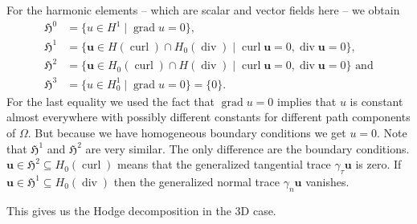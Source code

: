 \documentclass[12pt,a4paper]{article}
\numberwithin{equation}{subsection}
\numberwithin{lemma}{subsection}
\theoremstyle{definition}
\DeclareMathOperator{\curl}{curl}
\DeclareMathOperator{\diver}{div}
\DeclareMathOperator{\grad}{grad}
\begin{document}
For the harmonic elements -- which are scalar and vector fields here -- 
we obtain
\begin{align*}
    \mathfrak{H}^0 &= \{ u \in H^1 \mid \grad u = 0\},
    \\ \mathfrak{H}^1 &= \{ \mathbf{u} \in H(\curl) \cap H_0(\diver)
        \mid \curl \mathbf{u} = 0, \diver \mathbf{u} = 0\},
    \\ \mathfrak{H}^2 &= \{ \mathbf{u} \in H_0(\curl) \cap H(\diver)
        \mid \curl \mathbf{u} = 0, \diver \mathbf{u} = 0\} \text{ and}
    \\ \mathfrak{H}^3 &= \{ u \in H^1_0
       \mid \grad u = 0\} = \{0\}.
\end{align*}
For the last equality we used the fact that $\grad u = 0$ implies that 
$u$ is constant almost everywhere with possibly different constants for 
different path components of $\Omega$. But because we have homogeneous boundary 
conditions we get $u=0$. Note that $\mathfrak{H}^1$ and $\mathfrak{H}^2$ 
are very similar. The only difference are the boundary conditions. 
$\mathbf{u} \in \mathfrak{H}^2 \subseteq H_0(\curl)$ 
means that the generalized tangential 
trace $\gamma_\tau \mathbf{u}$ is zero. If $\mathbf{u}  \in \mathfrak{H}^1 
\subseteq H_0(\diver)$ 
then the 
generalized normal trace $\gamma_n \mathbf{u}$ vanishes.

This gives us the Hodge decomposition in the 3D case.
\end{document}
